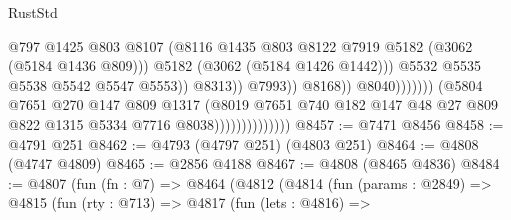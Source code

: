 \begin{lexlean}{RustStd}
\begin{coremodule}
                                                            @797
                                                            @1425
                                                            @803
                                                            @8107
                                                            (@8116
                                                              @1435
                                                              @803
                                                              @8122
                                                              @7919
                                                              @5182
                                                              (@3062 (@5184 @1436 @809)))
                                                            @5182
                                                            (@3062 (@5184 @1426 @1442)))
                                                          @5532
                                                          @5535
                                                          @5538
                                                          @5542
                                                          @5547
                                                          @5553))
                                                      @8313))
                                                  @7993))
                                              @8168))
                                          @8040)))))))
                            (@5804
                              @7651
                              @270
                              @147
                              @809
                              @1317
                              (@8019
                                @7651
                                @740
                                @182
                                @147
                                @48
                                @27
                                @809
                                @822
                                @1315
                                @5334
                                @7716
                                @8038))))))))))))))
@8457 := @7471 @8456
@8458 := @4791 @251
@8462 := @4793 (@4797 @251) (@4803 @251)
@8464 := @4808 (@4747 @4809)
@8465 := @2856 @4188
@8467 := @4808 (@8465 @4836)
@8484 := @4807
    (fun (fn : @7) =>
    @8464
      (@4812
        (@4814
          (fun (params : @2849) =>
          @4815
            (fun (rty : @713) =>
            @4817
              (fun (lets : @4816) =>

\end{coremodule}
\end{lexlean}
